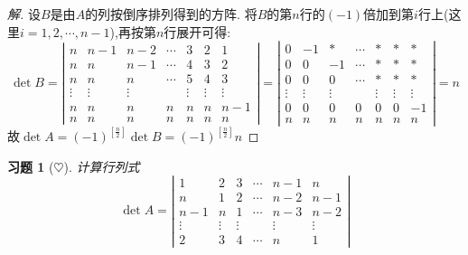 \documentclass[UTF8]{ctexart}
\newtheorem{ex}[thm]{习题}
\begin{document}
\begin{proof}[解]设$B$是由$A$的列按倒序排列得到的方阵. 将$B$的第$n$行的$(-1)$倍加到第$i$行上(这里$i=1,2,\cdots,n-1$),再按第$n$行展开可得:
$$\det B=\left|\begin{array}{ccccccc}
                 n & n-1 & n-2 & \cdots & 3 & 2 & 1 \\
                 n & n & n-1 & \cdots & 4 & 3 & 2 \\
                 n & n & n & \cdots & 5 & 4 & 3 \\
                 \vdots & \vdots & \vdots &  & \vdots & \vdots & \vdots \\
                 n & n & n & n & n & n & n-1 \\
                 n & n & n & n & n & n & n
               \end{array}
\right|=\left|\begin{array}{ccccccc}
                 0 & -1 & * & \cdots & * & * & * \\
                 0 & 0 & -1 & \cdots & * & * & * \\
                 0 & 0 & 0 & \cdots & * & * & * \\
                 \vdots & \vdots & \vdots &  & \vdots & \vdots & \vdots \\
                 0 & 0 & 0 & 0 & 0 & 0 & -1 \\
                 n & n & n & n & n & n & n
               \end{array}
\right|=n$$
故$\det A=(-1)^{\left[\frac{n}{2}\right]}\det B=(-1)^{\left[\frac{n}{2}\right]}n$
\end{proof}



\begin{ex}[$\heartsuit $]
计算行列式
$$\det A=\left|\begin{array}{cccccc}
                 1 & 2 & 3 & \cdots & n-1 & n \\
                 n & 1 & 2 & \cdots & n-2 & n-1 \\
                 n-1 & n & 1 & \cdots & n-3 & n-2 \\
                 \vdots & \vdots & \vdots &  & \vdots & \vdots \\
                 2 & 3 & 4 & \cdots & n & 1
               \end{array}
\right|$$
\end{ex}
\end{document}
